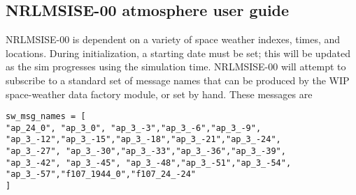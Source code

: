 \subsection{NRLMSISE-00 atmosphere user guide}
NRLMSISE-00 is dependent on a variety of space weather indexes, times, and locations. During initialization, a starting date must be set; this will be updated as the sim progresses using the simulation time. NRLMSISE-00 will attempt to subscribe to a standard set of message names that can be produced by the WIP space-weather data factory module, or set by hand. These messages are
\begin{verbatim}
sw_msg_names = [
"ap_24_0", "ap_3_0", "ap_3_-3","ap_3_-6","ap_3_-9",
"ap_3_-12","ap_3_-15","ap_3_-18","ap_3_-21","ap_3_-24",
"ap_3_-27", "ap_3_-30","ap_3_-33","ap_3_-36","ap_3_-39",
"ap_3_-42", "ap_3_-45", "ap_3_-48","ap_3_-51","ap_3_-54",
"ap_3_-57","f107_1944_0","f107_24_-24"
]
\end{verbatim}